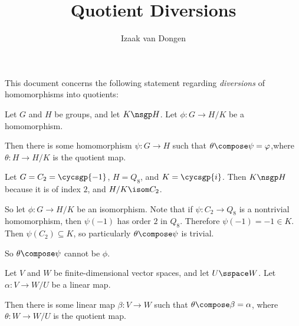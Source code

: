 \documentclass[a4paper,12pt]{article}
\author{Izaak van Dongen}
\title{Quotient Diversions}
\begin{document}
\maketitle

This document concerns the following statement regarding \emph{diversions} of
homomorphisms into quotients:
\begin{tcolorbox}
 Let \(G\) and \(H\) be groups, and let \(K \nsgp H\). Let
 \(\phi: G \to H/K\) be a homomorphism.

 Then there is some homomorphism \(\psi: G \to H\) such that
 \(\theta \compose \psi = \phi\),
 where \(\theta: H \to H/K\) is the quotient map.
\end{tcolorbox}
Let \(G = C_2 = \cycsgp{-1}\), \(H = Q_8\), and \(K = \cycsgp{i}\).
Then \(K \nsgp H\) because it is of index \(2\), and \(H/K \isom C_2\).

So let \(\phi: G \to H/K\) be an isomorphism.
Note that if \(\psi: C_2 \to Q_8\) is a nontrivial homomorphism, then
\(\psi(-1)\) has order \(2\) in \(Q_8\). Therefore \(\psi(-1) = -1 \in K\). Then
\(\psi(C_2) \subseteq K\), so particularly \(\theta \compose \psi\) is trivial.

So \(\theta \compose \psi\) cannot be \(\phi\).

\begin{tcolorbox}
 Let \(V\) and \(W\) be finite-dimensional vector spaces, and let
 \(U \sspace W\). Let \(\alpha: V \to W/U\) be a linear map.

 Then there is some linear map \(\beta: V \to W\) such that
 \(\theta \compose \beta = \alpha\), where \(\theta: W \to W/U\) is the quotient
 map.
\end{tcolorbox}
\end{document}
